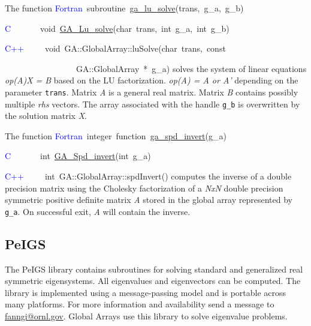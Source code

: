 The function
\textcolor{blue}{Fortran}~subroutine~\href{http://www.emsl.pnl.gov/docs/global/ga_ops.html\#ga_lu_solve}{ga\_{}lu\_{}solve}(trans,~g\_a,~g\_b)~

\textcolor{blue}{C}~~~~~~~void~\href{http://www.emsl.pnl.gov/docs/global/c_nga_ops.html\#ga_lu_solve}{GA\_{}Lu\_{}solve}(char~trans,~int~g\_a,~int~g\_b)~

\textcolor{blue}{C++}~~~~~void~GA::GlobalArray::luSolve(char~trans,~const~

~~~~~~~~~~~~~~~~~GA::GlobalArray~{*}~g\_a)
solves the system of linear equations\emph{ op(A)X = B} based on the
LU factorization. \emph{op(A) = A or A'} depending on the parameter
\texttt{trans}. Matrix\emph{ A} is a general real matrix. Matrix \emph{B}
contains possibly multiple \emph{rhs} vectors. The array associated
with the handle \texttt{g\_b} is overwritten by the solution matrix
\emph{X}.

The function
\textcolor{blue}{Fortran}~integer~function~\href{http://www.emsl.pnl.gov/docs/global/ga_ops.html\#ga_spd_invert}{ga\_{}spd\_{}invert}(g\_a)~

\textcolor{blue}{C}~~~~~~~int~\href{http://www.emsl.pnl.gov/docs/global/c_nga_ops.html\#ga_spd_invert}{GA\_{}Spd\_{}invert}(int~g\_a)~

\textcolor{blue}{C++}~~~~~int~GA::GlobalArray::spdInvert()
computes the inverse of a double precision matrix using the Cholesky
factorization of a \emph{NxN }double precision symmetric positive
definite matrix \emph{A} stored in the global array represented by
\texttt{g\_a}. On successful exit, \emph{A} will contain the inverse. 


\subsection{PeIGS }

The PeIGS library contains subroutines for solving standard and generalized
real symmetric eigensystems. All eigenvalues and eigenvectors can
be computed. The library is implemented using a message-passing model
and is portable across many platforms. For more information and availability
send a message to \href{mailto:fanngi@ornl.gov}{fanngi@ornl.gov}.
Global Arrays use this library to solve eigenvalue problems.


